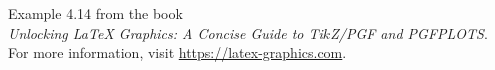 \documentclass{article}
\begin{document}
Example 4.14 from the book\\
\emph{Unlocking LaTeX Graphics: A Concise Guide to Ti$k$Z/PGF and PGFPLOTS}.\\
For more information, visit \url{https://latex-graphics.com}.
\par\bigskip

\end{document}

